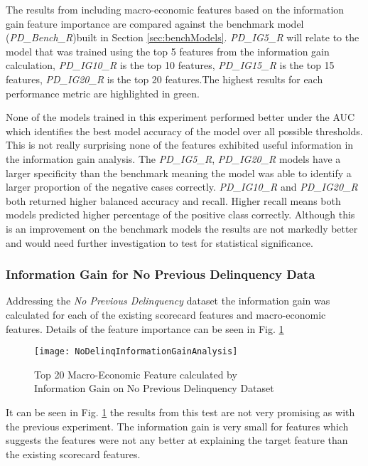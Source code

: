 The results from including macro-economic features based on the information gain feature importance are compared against the benchmark model (\textit{PD\_Bench\_R})built in Section \ref{sec:benchModels}. \textit{PD\_IG5\_R} will relate to the model that was trained using the top 5 features from the information gain calculation, \textit{PD\_IG10\_R} is the top 10 features, \textit{PD\_IG15\_R} is the top 15 features, \textit{PD\_IG20\_R} is the top 20 features.The highest results for each performance metric are highlighted in green.

None of the models trained in this experiment performed better under the AUC which identifies the best model accuracy of the model over all possible thresholds. This is not really surprising none of the features exhibited useful information in the information gain analysis. The \textit{PD\_IG5\_R}, \textit{PD\_IG20\_R} models have a larger specificity than the benchmark meaning the model was able to identify a larger proportion of the negative cases correctly. \textit{PD\_IG10\_R} and \textit{PD\_IG20\_R} both returned higher balanced accuracy and recall. Higher recall means both models predicted higher percentage of the positive class correctly. Although this is an improvement on the benchmark models the results are not markedly better and would need further investigation to test for statistical significance.

\subsubsection{Information Gain for No Previous Delinquency Data}\label{IGNPDExper}
Addressing the \textit{No Previous Delinquency} dataset the information gain was calculated for each of the existing scorecard features and macro-economic features. Details of the feature importance can be seen in Fig. \ref{fig:NoDelinqInformationGainAnalysis}

\begin{figure}[H]
	\texttt{[image: NoDelinqInformationGainAnalysis]}
	\caption{Top 20 Macro-Economic Feature calculated by \\ Information Gain on No Previous Delinquency Dataset}
	\label{fig:NoDelinqInformationGainAnalysis}
\end{figure}

It can be seen in Fig. \ref{fig:NoDelinqInformationGainAnalysis} the results from this test are not very promising as with the previous experiment. The information gain is very small for features which suggests the features were not any better at explaining the target feature than the existing scorecard features. 

